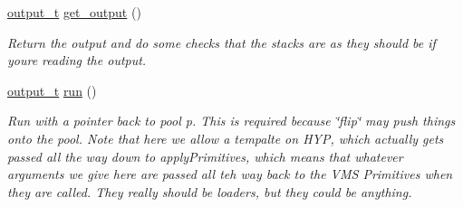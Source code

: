 \begin{DoxyCompactItemize}
\item 
\hyperlink{class_virtual_machine_state_a1015cee5061f82f82ef6a953b51f9bd5}{output\+\_\+t} \hyperlink{class_virtual_machine_state_ac2802775f8a7753dedf0363f83df4d03}{get\+\_\+output} ()
\begin{DoxyCompactList}\small\item\em Return the output and do some checks that the stacks are as they should be if you\textquotesingle{}re reading the output. \end{DoxyCompactList}\item 
\hyperlink{class_virtual_machine_state_a1015cee5061f82f82ef6a953b51f9bd5}{output\+\_\+t} \hyperlink{class_virtual_machine_state_a59185fde0c905d418a96a6acf28c15c3}{run} ()
\begin{DoxyCompactList}\small\item\em Run with a pointer back to pool p. This is required because \char`\"{}flip\char`\"{} may push things onto the pool. Note that here we allow a tempalte on H\+YP, which actually gets passed all the way down to apply\+Primitives, which means that whatever arguments we give here are passed all teh way back to the V\+MS Primitives when they are called. They really should be loaders, but they could be anything. \end{DoxyCompactList}\end{DoxyCompactItemize}
